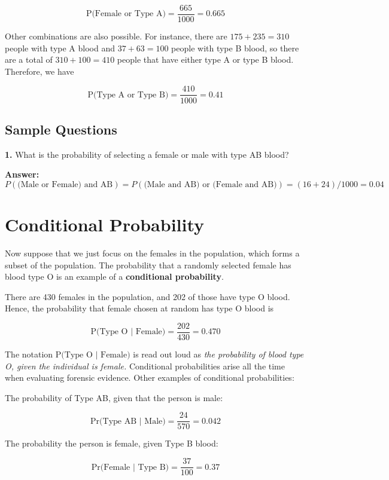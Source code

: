 \documentclass[
]{book}
\begin{document}
\[
\mbox{P(Female or Type A)} = \frac{665}{1000} = 0.665
\]

Other combinations are also possible. For instance,
there are \(175 + 235 = 310\) people with type A blood and \(37 + 63 = 100\) people with type B blood,
so there are a total of \(310 + 100 = 410\) people that have either type A or type B blood.
Therefore, we have

\[
\mbox{P(Type A or Type B)} = \frac{410}{1000} = 0.41
\]

\hypertarget{sample-questions-1}{%
\subsection{Sample Questions}\label{sample-questions-1}}

\textbf{1.} What is the probability of selecting a female or male with type AB blood?

\textbf{Answer:} \(P(\text{(Male or Female) and AB}) = P(\text{(Male and AB) or (Female and AB)}) = (16 + 24) / 1000 = 0.04\)

\hypertarget{conditional-probability}{%
\section{Conditional Probability}\label{conditional-probability}}

Now suppose that we just focus on the females in the population, which forms a subset of the population.
The probability that a randomly selected female has blood type O is an example of a \textbf{conditional probability}.

There are 430 females in the population, and 202 of those have type O blood.\\
Hence, the probability that female chosen at random has type O blood is

\[
\mbox{P(Type O | Female)} = \frac{202}{430} = 0.470
\]

The notation \(\mbox{P(Type O | Female)}\) is read out loud as \emph{the probability of blood type O, given the individual is female.}
Conditional probabilities arise all the time when evaluating forensic evidence. Other examples of conditional probabilities:

The probability of Type AB, given that the person is male:

\[
\mbox{Pr(Type AB | Male)} = \frac{24}{570} = 0.042
\]

The probability the person is female, given Type B blood:

\[
\mbox{Pr(Female | Type B)} = \frac{37}{100} = 0.37
\]
\end{document}
